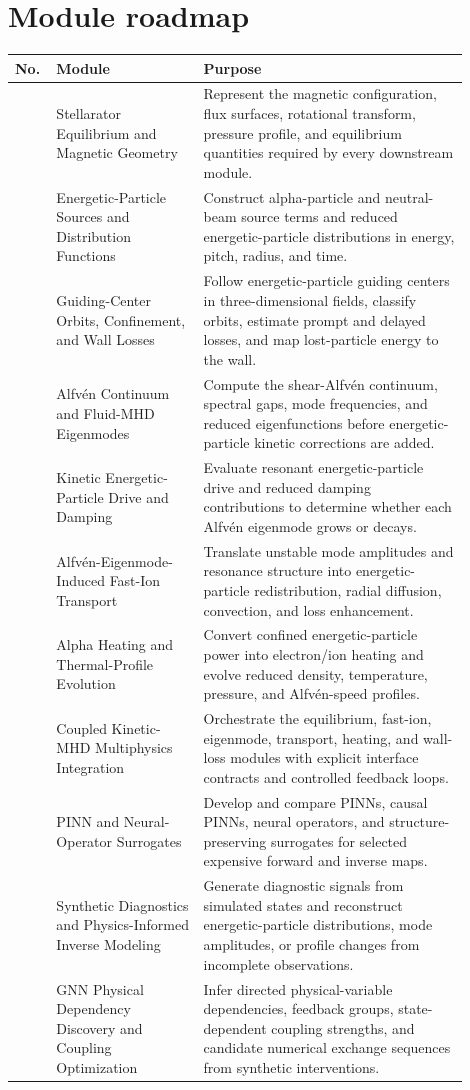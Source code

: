 \documentclass[11pt]{article}
\begin{document}
\section{Module roadmap}
{\small
\renewcommand{\arraystretch}{1.08}
\begin{longtable}{>{\RaggedRight\arraybackslash}p{0.06\linewidth} >{\RaggedRight\arraybackslash}p{0.30\linewidth} >{\RaggedRight\arraybackslash}p{0.54\linewidth}}
\toprule
\textbf{No.} & \textbf{Module} & \textbf{Purpose}\\
\midrule
1 & Stellarator Equilibrium and Magnetic Geometry & Represent the magnetic configuration, flux surfaces, rotational transform, pressure profile, and equilibrium quantities required by every downstream module.\\
2 & Energetic-Particle Sources and Distribution Functions & Construct alpha-particle and neutral-beam source terms and reduced energetic-particle distributions in energy, pitch, radius, and time.\\
3 & Guiding-Center Orbits, Confinement, and Wall Losses & Follow energetic-particle guiding centers in three-dimensional fields, classify orbits, estimate prompt and delayed losses, and map lost-particle energy to the wall.\\
4 & Alfvén Continuum and Fluid-MHD Eigenmodes & Compute the shear-Alfvén continuum, spectral gaps, mode frequencies, and reduced eigenfunctions before energetic-particle kinetic corrections are added.\\
5 & Kinetic Energetic-Particle Drive and Damping & Evaluate resonant energetic-particle drive and reduced damping contributions to determine whether each Alfvén eigenmode grows or decays.\\
6 & Alfvén-Eigenmode-Induced Fast-Ion Transport & Translate unstable mode amplitudes and resonance structure into energetic-particle redistribution, radial diffusion, convection, and loss enhancement.\\
7 & Alpha Heating and Thermal-Profile Evolution & Convert confined energetic-particle power into electron/ion heating and evolve reduced density, temperature, pressure, and Alfvén-speed profiles.\\
8 & Coupled Kinetic-MHD Multiphysics Integration & Orchestrate the equilibrium, fast-ion, eigenmode, transport, heating, and wall-loss modules with explicit interface contracts and controlled feedback loops.\\
9 & PINN and Neural-Operator Surrogates & Develop and compare PINNs, causal PINNs, neural operators, and structure-preserving surrogates for selected expensive forward and inverse maps.\\
10 & Synthetic Diagnostics and Physics-Informed Inverse Modeling & Generate diagnostic signals from simulated states and reconstruct energetic-particle distributions, mode amplitudes, or profile changes from incomplete observations.\\
11 & GNN Physical Dependency Discovery and Coupling Optimization & Infer directed physical-variable dependencies, feedback groups, state-dependent coupling strengths, and candidate numerical exchange sequences from synthetic interventions.\\
\bottomrule
\end{longtable}
}
\end{document}
